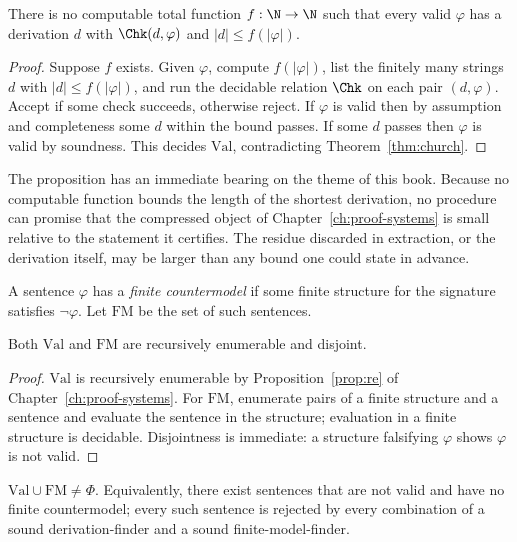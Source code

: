 \begin{proposition}
\label{prop:no-bound}
There is no computable total function $f:\N\to\N$ such that every valid $\varphi$ has a derivation $d$ with $\Chk(d,\varphi)$ and $|d|\le f(|\varphi|)$.
\end{proposition}

\begin{proof}
Suppose $f$ exists. Given $\varphi$, compute $f(|\varphi|)$, list the finitely many strings $d$ with $|d|\le f(|\varphi|)$, and run the decidable relation $\Chk$ on each pair $(d,\varphi)$. Accept if some check succeeds, otherwise reject. If $\varphi$ is valid then by assumption and completeness some $d$ within the bound passes. If some $d$ passes then $\varphi$ is valid by soundness. This decides $\mathrm{Val}$, contradicting Theorem~\ref{thm:church}.
\end{proof}

The proposition has an immediate bearing on the theme of this book. Because no computable function bounds the length of the shortest derivation, no procedure can promise that the compressed object of Chapter~\ref{ch:proof-systems} is small relative to the statement it certifies. The residue discarded in extraction, or the derivation itself, may be larger than any bound one could state in advance.

\begin{definition}
\label{def:finite-countermodel}
A sentence $\varphi$ has a \emph{finite countermodel} if some finite structure for the signature satisfies $\neg\varphi$. Let $\mathrm{FM}$ be the set of such sentences.
\end{definition}

\begin{proposition}
\label{prop:two-enum}
Both $\mathrm{Val}$ and $\mathrm{FM}$ are recursively enumerable and disjoint.
\end{proposition}

\begin{proof}
$\mathrm{Val}$ is recursively enumerable by Proposition~\ref{prop:re} of Chapter~\ref{ch:proof-systems}. For $\mathrm{FM}$, enumerate pairs of a finite structure and a sentence and evaluate the sentence in the structure; evaluation in a finite structure is decidable. Disjointness is immediate: a structure falsifying $\varphi$ shows $\varphi$ is not valid.
\end{proof}

\begin{corollary}
\label{cor:neither}
$\mathrm{Val}\cup\mathrm{FM}\ne\Phi$. Equivalently, there exist sentences that are not valid and have no finite countermodel; every such sentence is rejected by every combination of a sound derivation-finder and a sound finite-model-finder.
\end{corollary}

